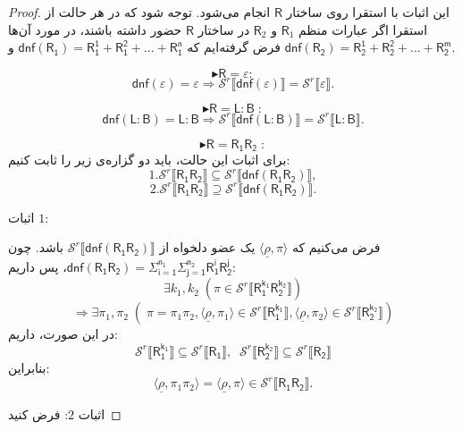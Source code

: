 \begin{proof}
	این اثبات با استقرا روی ساختار $\mathsf{R}$ انجام می‌شود.
	توجه شود که در هر حالت از استقرا اگر عبارات منظم 
	$\mathsf{R}_1$
	و
	$\mathsf {R}_2$
	در ساختار $\mathsf{R}$ حضور داشته باشند، در مورد آن‌ها فرض گرفته‌ایم که 
	$\mathsf{dnf(R_1)=R_1^1+R_1^2+...+R_1^n}$
	و
	$\mathsf{dnf(R_2)=R_2^1+R_2^2+...+R_2^m}$.
		
	$$\blacktriangleright \mathsf{R=\varepsilon:}$$
	$$\mathsf{dnf}(\varepsilon)=\varepsilon \Rightarrow 
		\mathcal{S}^r \llbracket \mathsf{dnf(\varepsilon)} \rrbracket =
		\mathcal{S}^r \llbracket \varepsilon \rrbracket.$$
	
	$$\blacktriangleright \mathsf{R=L:B\;:}$$
	$$\mathsf{dnf(L:B)=L:B} \Rightarrow 
	\mathcal{S}^r \llbracket \mathsf{dnf(L:B)} \rrbracket =
	\mathcal{S}^r \llbracket \mathsf{L:B} \rrbracket.$$
	
	$$\blacktriangleright \mathsf{R=R_1 R_2\;:}$$
	برای اثبات این حالت، باید دو گزاره‌ی زیر را ثابت کنیم:
	$$1.\mathcal{S}^r \llbracket \mathsf{R_1 R_2} \rrbracket \subseteq
	  \mathcal{S}^r \llbracket \mathsf{dnf(R_1 R_2)} \rrbracket,$$
	$$2.\mathcal{S}^r \llbracket \mathsf{R_1 R_2} \rrbracket \supseteq
	\mathcal{S}^r \llbracket \mathsf{dnf(R_1 R_2)} \rrbracket.$$
	
	
	اثبات $1$:
	
	فرض می‌کنیم که 
	$\langle \underline{\rho} , \pi \rangle$ 
	یک عضو دلخواه از 
	$\mathcal{S}^r \llbracket \mathsf{dnf(R_1 R_2)} \rrbracket$
	باشد.
	چون 
	$\mathsf{dnf(R_1R_2)=} \mathsf{\Sigma_{i=1}^{n_1} \Sigma_{j=1}^{n_2} R_1^i R_2^j }$،
	 پس داریم:
	$$\exists k_1,k_2\;
	(\pi \in \mathcal{S}^r \llbracket \mathsf{R_1^{k_1} R_2^{k_2}} \rrbracket)
	$$
	$$\Rightarrow
	\exists \pi_1, \pi_2 \; ( \; \pi=\pi_1 \pi_2 , 
	\langle \underline{\rho} , \pi_1 \rangle \in \mathcal{S}^r \llbracket \mathsf{R_1^{k_1}} \rrbracket,
	\langle \underline{\rho} , \pi_2 \rangle \in \mathcal{S}^r \llbracket \mathsf{R_2^{k_2}} \rrbracket)
	$$
	در این صورت، داریم:
	$$\mathcal{S}^r \llbracket \mathsf{R_1^{k_1}} \rrbracket \subseteq
	\mathcal{S}^r \llbracket \mathsf{R_1} \rrbracket,\;\;
	\mathcal{S}^r \llbracket \mathsf{R_2^{k_2}} \rrbracket \subseteq
	\mathcal{S}^r \llbracket \mathsf{R_2} \rrbracket$$
	بنابراین:
	$$
	\langle \underline{\rho} , \pi_1 \pi_2 \rangle =
	\langle \underline{\rho} , \pi \rangle \in 
	\mathcal{S}^r \llbracket \mathsf{R_1 R_2} \rrbracket.$$ 
	
	اثبات $2$: فرض کنید
	

\end{proof}
